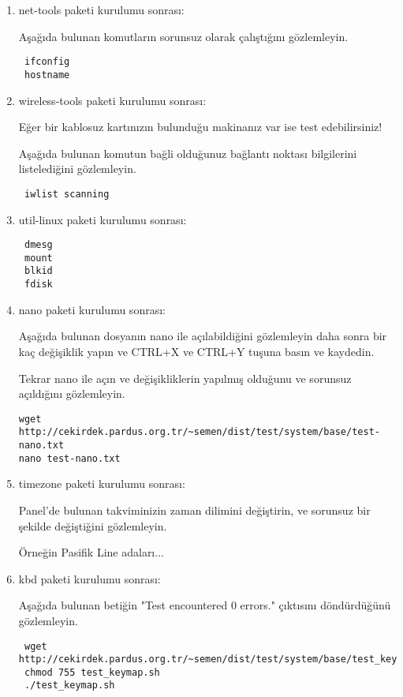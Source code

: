 \documentclass[a4paper,10pt]{article}
\begin{document}
\begin{enumerate}
\item net-tools paketi kurulumu sonrası:

Aşağıda bulunan komutların sorunsuz olarak çalıştığını gözlemleyin.
\begin{verbatim}
 ifconfig
 hostname
\end{verbatim}


\item wireless-tools paketi kurulumu sonrası:

Eğer bir kablosuz kartınızın bulunduğu makinanız var ise test edebilirsiniz!

Aşağıda bulunan komutun bağli olduğunuz bağlantı noktası bilgilerini listelediğini gözlemleyin.
\begin{verbatim}
 iwlist scanning
\end{verbatim}


\item util-linux paketi kurulumu sonrası:
\begin{verbatim}
 dmesg
 mount 
 blkid
 fdisk
\end{verbatim}

\item nano paketi kurulumu sonrası:

Aşağıda bulunan dosyanın nano ile açılabildiğini gözlemleyin daha sonra bir kaç değişiklik yapın ve CTRL+X ve CTRL+Y tuşuna basın ve kaydedin. 

Tekrar nano ile açın ve değişikliklerin yapılmış olduğunu ve sorunsuz açıldığını gözlemleyin.
\begin{verbatim}
wget http://cekirdek.pardus.org.tr/~semen/dist/test/system/base/test-nano.txt 
nano test-nano.txt
\end{verbatim}


\item timezone paketi kurulumu sonrası:

Panel'de bulunan takviminizin zaman dilimini değiştirin, ve sorunsuz bir şekilde değiştiğini gözlemleyin.

Örneğin Pasifik Line adaları...

\item kbd paketi kurulumu sonrası:

Aşağıda bulunan betiğin "Test encountered 0 errors." çıktısını döndürdüğünü gözlemleyin.
\begin{verbatim}
 wget http://cekirdek.pardus.org.tr/~semen/dist/test/system/base/test_keymap.sh
 chmod 755 test_keymap.sh
 ./test_keymap.sh
\end{verbatim}




\end{enumerate}
\end{document}
